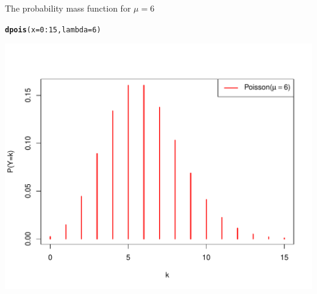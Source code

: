 \documentclass[10pt,handout]{beamer}\usepackage[]{graphicx}\usepackage[]{color}
\makeatletter
\def\maxwidth{ %
  \ifdim\Gin@nat@width>\linewidth
    \linewidth
  \else
    \Gin@nat@width
  \fi
}
\newcommand{\hlnum}[1]{\textcolor[rgb]{0.686,0.059,0.569}{#1}}%
\newcommand{\hlopt}[1]{\textcolor[rgb]{0,0,0}{#1}}%
\newcommand{\hlstd}[1]{\textcolor[rgb]{0.345,0.345,0.345}{#1}}%
\newcommand{\hlkwc}[1]{\textcolor[rgb]{0.333,0.667,0.333}{#1}}%
\newcommand{\hlkwd}[1]{\textcolor[rgb]{0.737,0.353,0.396}{\textbf{#1}}}%
\newenvironment{kframe}{%
 \def\at@end@of@kframe{}%
 \ifinner\ifhmode%
  \def\at@end@of@kframe{\end{minipage}}%
  \begin{minipage}{\columnwidth}%
 \fi\fi%
 \def\FrameCommand##1{\hskip\@totalleftmargin \hskip-\fboxsep
 \colorbox{shadecolor}{##1}\hskip-\fboxsep
     \hskip-\linewidth \hskip-\@totalleftmargin \hskip\columnwidth}%
 \MakeFramed {\advance\hsize-\width
   \@totalleftmargin\z@ \linewidth\hsize
   \@setminipage}}%
 {\par\unskip\endMakeFramed%
 \at@end@of@kframe}
\newenvironment{knitrout}{}{} %
\makeatother
\begin{document}
\begin{frame}[fragile]{The probability mass function for $\mu=6$}
	
\begin{knitrout}\tiny
{}\color{fgcolor}\begin{kframe}
\begin{alltt}
\hlkwd{dpois}\hlstd{(}\hlkwc{x} \hlstd{=} \hlnum{0}\hlopt{:}\hlnum{15}\hlstd{,} \hlkwc{lambda} \hlstd{=} \hlnum{6}\hlstd{)}
\end{alltt}
\end{kframe}
\end{knitrout}
	
	\vspace*{-0.5in}
	
\begin{knitrout}\tiny
{}\color{fgcolor}

{\centering \includegraphics[width=\maxwidth]{figure/unnamed-chunk-10-1} 

}



\end{knitrout}
	
\end{frame}
\end{document}
